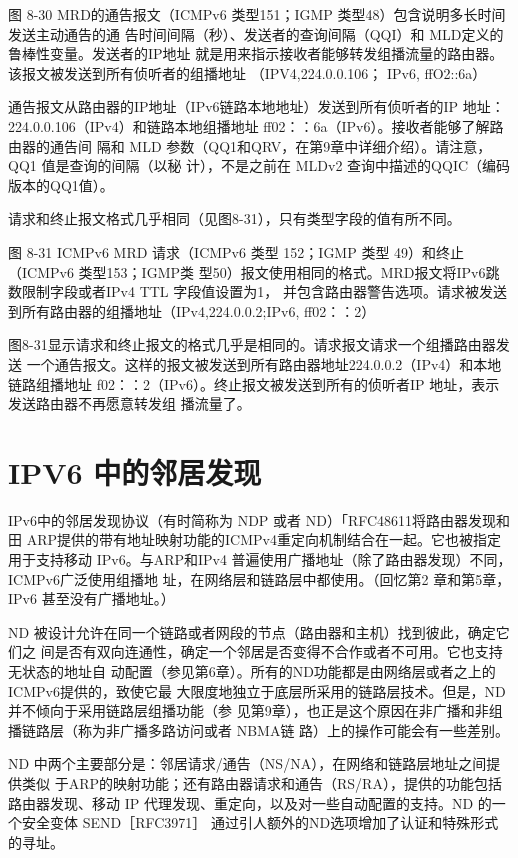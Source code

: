 图 8-30 MRD的通告报文（ICMPv6 类型151；IGMP 类型48）包含说明多长时间发送主动通告的通
告时间间隔（秒）、发送者的查询间隔（QQI）和 MLD定义的鲁棒性变量。发送者的IP地址
就是用来指示接收者能够转发组播流量的路由器。该报文被发送到所有侦听者的组播地址
（IPV4,224.0.0.106； IPv6, ffO2::6a）

通告报文从路由器的IP地址（IPv6链路本地地址）发送到所有侦听者的IP 地址：
224.0.0.106（IPv4）和链路本地组播地址 ff02：：6a（IPv6）。接收者能够了解路由器的通告间
隔和 MLD 参数（QQ1和QRV，在第9章中详细介绍）。请注意，QQ1 值是查询的间隔（以秘
计），不是之前在 MLDv2 查询中描述的QQIC（编码版本的QQ1值）。

请求和终止报文格式几乎相同（见图8-31），只有类型字段的值有所不同。

图 8-31
ICMPv6 MRD 请求（ICMPv6 类型 152；IGMP 类型 49）和终止（ICMPv6 类型153；IGMP类
型50）报文使用相同的格式。MRD报文将IPv6跳数限制字段或者IPv4 TTL 字段值设置为1，
并包含路由器警告选项。请求被发送到所有路由器的组播地址（IPv4,224.0.0.2;IPv6, ff02：：2）

图8-31显示请求和终止报文的格式几乎是相同的。请求报文请求一个组播路由器发送
一个通告报文。这样的报文被发送到所有路由器地址224.0.0.2（IPv4）和本地链路组播地址
f02：：2（IPv6）。终止报文被发送到所有的侦听者IP 地址，表示发送路由器不再愿意转发组
播流量了。

\section{IPV6 中的邻居发现}

IPv6中的邻居发现协议（有时简称为 NDP 或者 ND）「RFC48611将路由器发现和田
ARP提供的带有地址映射功能的ICMPv4重定向机制结合在一起。它也被指定用于支持移动
IPv6。与ARP和IPv4 普遍使用广播地址（除了路由器发现）不同，ICMPv6广泛使用组播地
址，在网络层和链路层中都使用。（回忆第2 章和第5章，IPv6 甚至没有广播地址。）

ND 被设计允许在同一个链路或者网段的节点（路由器和主机）找到彼此，确定它们之
间是否有双向连通性，确定一个邻居是否变得不合作或者不可用。它也支持无状态的地址自
动配置（参见第6章）。所有的ND功能都是由网络层或者之上的ICMPv6提供的，致使它最
大限度地独立于底层所采用的链路层技术。但是，ND 并不倾向于采用链路层组播功能（参
见第9章），也正是这个原因在非广播和非组播链路层（称为非广播多路访问或者 NBMA链
路）上的操作可能会有一些差别。

ND 中两个主要部分是：邻居请求/通告（NS/NA），在网络和链路层地址之间提供类似
于ARP的映射功能；还有路由器请求和通告（RS/RA），提供的功能包括路由器发现、移动
IP 代理发现、重定向，以及对一些自动配置的支持。ND 的一个安全变体 SEND［RFC3971］
通过引人额外的ND选项增加了认证和特殊形式的寻址。

